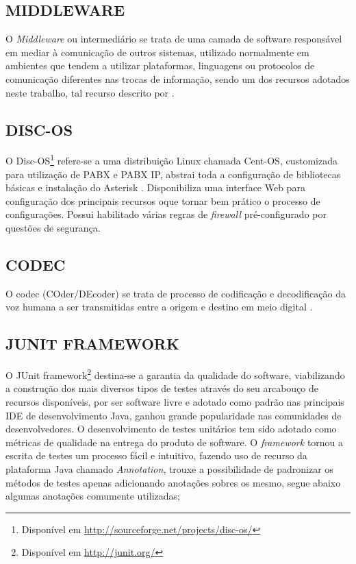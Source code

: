 \subsection{\textbf{\uppercase{Middleware}}}
O \textit{Middleware} ou intermediário se trata de uma camada de software responsável em mediar à comunicação de outros sistemas, utilizado normalmente em ambientes que tendem a utilizar plataformas, linguagens ou protocolos de comunicação diferentes nas trocas de informação, sendo um dos recursos adotados neste trabalho, tal recurso descrito por .

\subsection{\textbf{\uppercase{Disc-OS}}}
O Disc-OS\footnote{Disponível em \url{http://sourceforge.net/projects/disc-os/}}\label{key:DISC-OS} refere-se a uma distribuição Linux chamada Cent-OS, customizada para utilização de PABX e PABX IP, abstrai toda a configuração de bibliotecas básicas e instalação do Asterisk \cite{DARU:2008}. Disponibiliza uma interface Web para configuração dos principais recursos oque tornar bem prático o processo de configurações. Possui habilitado várias regras de \textit{firewall} pré-configurado por questões de segurança.

\subsection{\textbf{\uppercase{Codec}}}
O codec (COder/DEcoder) se trata de processo de codificação e decodificação da voz humana a ser transmitidas entre a origem e destino em meio digital \cite{VIEIRA:2007}.

\subsection{\textbf{\uppercase{JUnit Framework}}}
O JUnit framework\footnote{Disponível em \url{http://junit.org/}} destina-se a garantia da qualidade do software, viabilizando a construção dos mais diversos tipos de testes através do seu arcabouço de recursos disponíveis, por ser software livre e adotado como padrão nas principais IDE de desenvolvimento Java, ganhou grande popularidade nas comunidades de desenvolvedores. O desenvolvimento de testes unitários tem sido adotado como métricas de qualidade na entrega do produto de software.
O \textit{framework} tornou a escrita de testes um processo fácil e intuitivo, fazendo uso de recurso da plataforma Java chamado \textit{Annotation}\label{key:annotation}, trouxe a possibilidade de padronizar os métodos de testes apenas adicionando anotações sobres os mesmo, segue abaixo algumas anotações comumente utilizadas;

